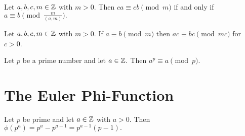 \documentclass[letterpaper, 11 pt]{ximera}
\begin{document}
\begin{prop*}[Proposition 2.5]\label{prop:equiv-gcd}
    Let $a,b,c,m\in\mathbb Z$ with $m>0.$ Then $ca\equiv cb\pmod{m}$ if and only if $a\equiv b\pmod{\tfrac{m}{(a,m)}}.$
\end{prop*}


\begin{lem*}\label{ex-equiv-upmod}
    Let $a,b,c,m\in\mathbb Z$ with $m>0.$ If $a\equiv b \pmod{m}$ then $ac\equiv bc \pmod{mc}$ for $c>0$.
\end{lem*}


\begin{cor*}[Corollary 2.15]\label{cor:a_power_prime_mod}
    Let $p$ be a prime number and let $a\in\mathbb Z.$ Then $a^p\equiv a\pmod{p}.$
\end{cor*}

\section{The Euler Phi-Function}

\begin{thm*}[Theorem 3.3]\label{thm:phi-prime-power}
    Let $p$ be prime and let $a\in\mathbb Z$ with $a>0.$ Then $\phi(p^a)=p^a-p^{a-1}=p^{a-1}(p-1).$
\end{thm*}
\end{document}
